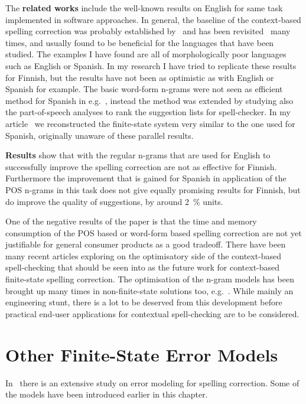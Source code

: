 \documentclass[officiallayout]{unihelcompling}
\begin{document}
The \textbf{related works} include the well-known results on English for same
task implemented in software approaches.  In general, the baseline of the
context-based spelling correction was probably established
by~\citet{mays1991context} and has been
revisited~\citep{wilcox-ohearn2008realword} many times, and usually found to be
beneficial for the languages that have been studied. The examples I have found
are all of morphologically poor languages such as English or Spanish. In my
research I have tried to replicate these results for Finnish, but the results
have not been as optimistic as with English or Spanish for example.  The basic
word-form n-grams were not seen as efficient method for Spanish in
e.g.~\citet{otero2007contextual}, instead the method was extended by studying
also the part-of-speech analyses to rank the suggestion lists for
spell-checker. In my article~ we
reconstructed the finite-state system very similar to the one used for Spanish,
originally unaware of these parallel results.

\textbf{Results} show that with the regular n-grams that are used for English
to successfully improve the spelling correction are not as effective for 
Finnish. Furthermore the improvement that is gained for Spanish in application
of the POS n-grams in this task does not give equally promising results for
Finnish, but do improve the quality of suggestions, by around 2~\% 
units.

One of the negative results of the paper is that the time and memory
consumption of the POS based or word-form based spelling correction are not yet
justifiable for general consumer products as a good tradeoff. There have been
many recent articles exploring on the optimisatory side of the context-based
spell-checking that should be seen into as the future work for context-based
finite-state spelling correction. The optimisation of the n-gram models has
been brought up many times in non-finite-state solutions too,
e.g.~\citep{church2007compressing}. While mainly an engineering stunt, there is
a lot to be deserved from this development before practical end-user
applications for contextual spell-checking are to be considered.

\section{Other Finite-State Error Models}
\label{sec:other-errors}

In~\citet{deorowicz2005correcting} there is an extensive study on error
modeling for spelling correction. Some of the models have been
introduced earlier in this chapter.
\end{document}
